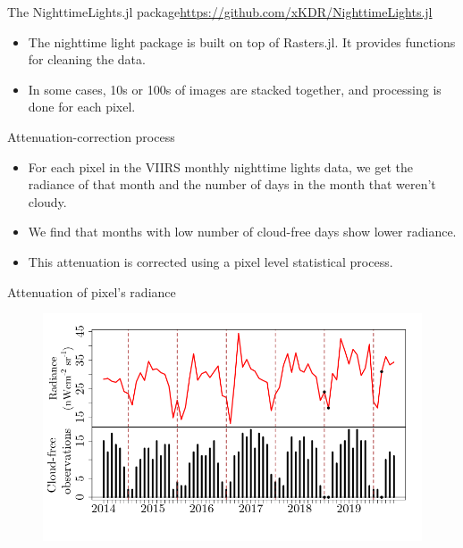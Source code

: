 \documentclass[aspectratio=169]{beamer} %
\begin{document}
        \begin{frame}{The NighttimeLights.jl package}{\url{https://github.com/xKDR/NighttimeLights.jl}}
          \begin{itemize}
            \item The nighttime light package is built on top of Rasters.jl. It provides functions for cleaning the data. 
            \item In some cases, 10s or 100s of images are stacked together, and processing is done for each pixel. 
          \end{itemize}
        \end{frame}

        \begin{frame}{Attenuation-correction process}
          \begin{itemize}
            \item For each pixel in the VIIRS monthly nighttime lights data, we get the radiance of that month and the number of days in the month that weren't cloudy.
            \item We find that months with low number of cloud-free days show lower radiance. 
            \item This attenuation is corrected using a pixel level statistical process. 
          \end{itemize}
            
        \end{frame}

        \begin{frame}{Attenuation of pixel's radiance}
          \begin{figure}
            \includegraphics[width=0.8\linewidth]{biased_pixel.png}
          \end{figure}
        \end{frame}
\end{document}

